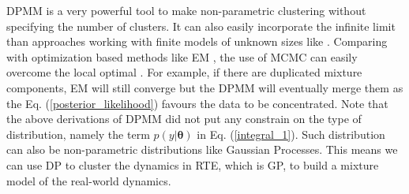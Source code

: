 \documentclass[journal]{IEEEtran}
\begin{document}
DPMM is a very powerful tool to make non-parametric clustering without specifying the number of clusters. 
It can also easily incorporate the infinite limit than approaches working with finite models of unknown sizes like \cite{Bayesian_mixture}.
Comparing with optimization based methods like EM \cite{EM}, the use of MCMC can easily overcome the local optimal \cite{infinite_GMM}. 
For example, if there are duplicated mixture components, EM will still converge but the DPMM will eventually merge them as the Eq. (\ref{posterior_likelihood}) favours the data to be concentrated. 
Note that the above derivations of DPMM did not put any constrain on the type of distribution, namely the term $p(y|\bm{\theta})$ in Eq. (\ref{integral_1}). Such distribution can also be non-parametric distributions like Gaussian Processes. 
This means we can use DP to cluster the dynamics in RTE, which is GP, to build a mixture model of the real-world dynamics.




\end{document}
